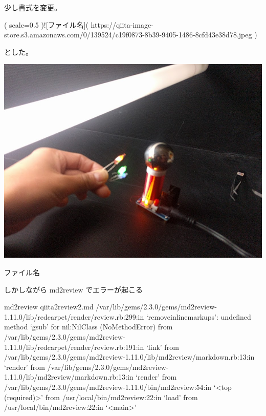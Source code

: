 少し書式を変更。

\begin{reviewemlist}
[]( scale=0.5 )![ファイル名]( https://qiita{-}image{-}store.s3.amazonaws.com/0/139524/c19f0873{-}8b39{-}9405{-}1486{-}8cfd43e38d78.jpeg )
\end{reviewemlist}

とした。

\begin{reviewimage}
\includegraphics[scale=0.5 ]{./images/c19f0873-8b39-9405-1486-8cfd43e38d78.jpeg}
\caption{ファイル名}
\label{image:qiita2review:c19f0873-8b39-9405-1486-8cfd43e38d78}
\end{reviewimage}

しかしながら md2review でエラーが起こる

\begin{reviewemlist}
 md2review qiita2review2.md
/var/lib/gems/2.3.0/gems/md2review{-}1.11.0/lib/redcarpet/render/review.rb:299:in `remove\textunderscore{}inline\textunderscore{}markups': undefined method `gsub' for nil:NilClass (NoMethodError)
    from /var/lib/gems/2.3.0/gems/md2review{-}1.11.0/lib/redcarpet/render/review.rb:191:in `link'
    from /var/lib/gems/2.3.0/gems/md2review{-}1.11.0/lib/md2review/markdown.rb:13:in `render'
    from /var/lib/gems/2.3.0/gems/md2review{-}1.11.0/lib/md2review/markdown.rb:13:in `render'
    from /var/lib/gems/2.3.0/gems/md2review{-}1.11.0/bin/md2review:54:in `\textless{}top (required)\textgreater{}'
    from /usr/local/bin/md2review:22:in `load'
    from /usr/local/bin/md2review:22:in `\textless{}main\textgreater{}'

\end{reviewemlist}

